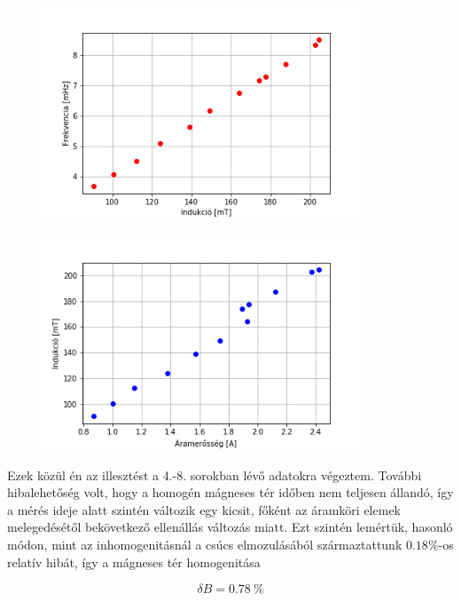 \documentclass[a4paper,12pt]{article}
\begin{document}
\begin{figure}[!h]
\centering
\includegraphics[width=0.85\textwidth]{indukcio-freki.png}
\end{figure}

\begin{figure}[!h]
\centering
\includegraphics[width=0.85\textwidth]{./adatok/hiszterezis.png}
\label{Hiszeterézis}
\end{figure}

\par Ezek közül én az illesztést a 4.-8. sorokban lévő adatokra végeztem. További hibalehetőség volt, hogy a homogén mágneses tér időben nem teljesen állandó, így a mérés ideje alatt szintén változik egy kicsit, főként az áramköri elemek melegedésétől bekövetkező ellenállás változás miatt. Ezt szintén lemértük, hasonló módon, mint az inhomogenitásnál a csúcs elmozulásából származtattunk $0.18\%$-os relatív hibát, így a mágneses tér homogenitása 

\begin{equation*}
	\delta B = 0.78 ~\%
\end{equation*}
\end{document}
